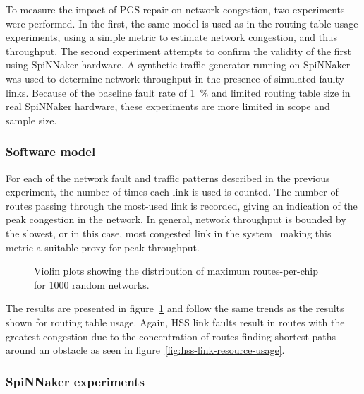 			To measure the impact of PGS repair on network congestion, two
			experiments were performed. In the first, the same model is used as in
			the routing table usage experiments, using a simple metric to estimate
			network congestion, and thus throughput. The second experiment attempts
			to confirm the validity of the first using SpiNNaker hardware. A
			synthetic traffic generator running on SpiNNaker was used to determine
			network throughput in the presence of simulated faulty links.  Because of
			the baseline fault rate of \SI{1}{\percent} and limited routing table
			size in real SpiNNaker hardware, these experiments are more limited in
			scope and sample size.
			
			\subsubsection{Software model}
			
				For each of the network fault and traffic patterns described in the
				previous experiment, the number of times each link is used is counted.
				The number of routes passing through the most-used link is recorded,
				giving an indication of the peak congestion in the network.  In
				general, network throughput is bounded by the slowest, or in this case,
				most congested link in the system~\cite[chapter~1]{dally04} making this
				metric a suitable proxy for peak throughput.
				
				\begin{figure}
					\center
					
					\caption[Distribution of routes-per-chip for \num{1000} random networks.]%
					{Violin plots showing the distribution of maximum
					routes-per-chip for \num{1000} random networks.}
					\label{fig:routing-resource}
				\end{figure}
				
				The results are presented in figure~\ref{fig:routing-resource} and
				follow the same trends as the results shown for routing table usage.
				Again, HSS link faults result in routes with the greatest congestion
				due to the concentration of routes finding shortest paths around an
				obstacle as seen in figure~\ref{fig:hss-link-resource-usage}.
			
			\subsubsection{SpiNNaker experiments}
			
